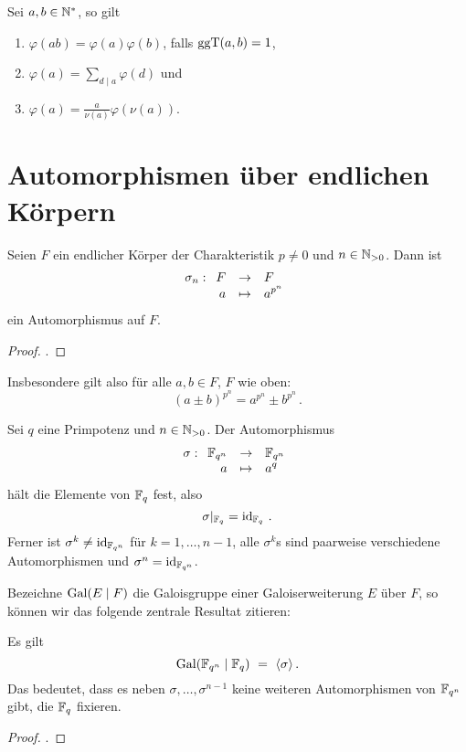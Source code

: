 \begin{lemma}
  \label{lemma:rechenregeln_phifunktion}
  Sei $a,b\in\mathbb{N}^\ast$, so gilt
  \begin{enumerate}
    \item $\varphi(ab) = \varphi(a)\varphi(b)$, falls $\operatorname{ggT}(a,b) = 1$,
    \item $\varphi(a) = \sum_{d\mid a} \varphi(d)$ und
    \item $\varphi(a) = \tfrac{a}{\nu(a)}\varphi(\nu(a))$.
  \end{enumerate}
\end{lemma}

\section{Automorphismen über endlichen Körpern}

\begin{satz}
  \label{satz:frob_auto}
  Seien $F$ ein endlicher Körper der Charakteristik $p\neq 0$ und 
  $n\in \mathbb{N}_{>0}$. Dann ist
  \[ \sigma_n: \funcdef{F &\to& F\\
    a &\mapsto& a^{p^n}}\]
  ein Automorphismus auf $F$.
\end{satz}
\begin{proof}
  \autocite[Corollary 3.18]{wan2003lectures}.
\end{proof}

\begin{bemerkung}
  Insbesondere gilt also für alle $a,b\in F$, $F$ wie oben:
  \[ (a\pm b)^{p^n} = a^{p^n} \pm b^{p^n}\,.\]
\end{bemerkung}

\begin{satz}
  \label{satz:frob_fix}
  Sei $q$ eine Primpotenz und $n\in \mathbb{N}_{>0}$. Der Automorphismus
  \[ \sigma: \funcdef{\F_{q^n} &\to& \F_{q^n}\\
    a &\mapsto& a^q}\]
  hält die Elemente von $\mathbb{F}_q$ fest, also 
  \[ \sigma |_{\mathbb{F}_q} = \operatorname{id}_{\mathbb{F}_q}\,.\]
  Ferner ist $\sigma^k \neq \operatorname{id}_{\mathbb{F}_{q^n}}$ für $k=1,\ldots,n-1$, alle
  $\sigma^k$s sind paarweise verschiedene Automorphismen und 
  $\sigma^n = \operatorname{id}_{\mathbb{F}_{q^n}}$.
\end{satz}


Bezeichne $\operatorname{Gal}(E \mid F)$ die Galoisgruppe einer Galoiserweiterung $E$ über
$F$, so können wir das folgende zentrale Resultat zitieren:

\begin{satz}
  \label{satz:frob_sind_alle_autos}
  Es gilt
  \[ \operatorname{Gal}(\mathbb{F}_{q^n}\mid \mathbb{F}_q) \ =\  \langle \sigma\rangle\,.\]
  Das bedeutet, dass es neben $\sigma,\ldots,\sigma^{n-1}$ keine weiteren
  Automorphismen von $\mathbb{F}_{q^n}$ gibt, die $\mathbb{F}_q$ fixieren.
\end{satz}
\begin{proof}
  \autocite[Theorem 7.3]{wan2003lectures}.
\end{proof}

